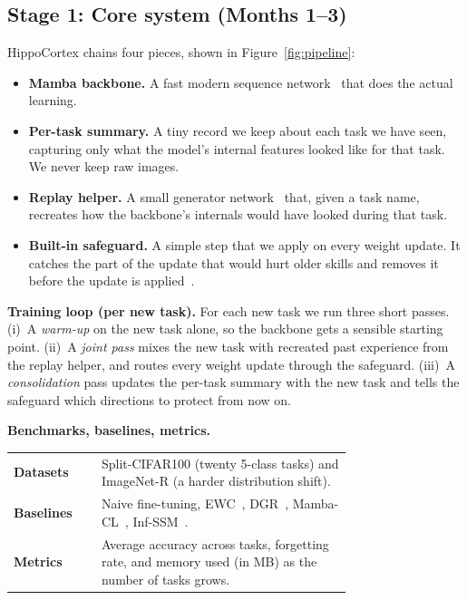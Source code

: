 \documentclass[11pt,a4paper]{article}
\begin{document}
\subsection{Stage 1: Core system (Months 1--3)}
HippoCortex chains four pieces, shown in Figure~\ref{fig:pipeline}:
\begin{itemize}[leftmargin=1.4em,itemsep=0.05em,topsep=0.1em]
  \item \textbf{Mamba backbone.} A fast modern sequence network~\citep{gu2023mamba} that does the actual learning.
  \item \textbf{Per-task summary.} A tiny record we keep about each task we have seen, capturing only what the model's internal features looked like for that task. We never keep raw images.
  \item \textbf{Replay helper.} A small generator network~\citep{sohn2015learning} that, given a task name, recreates how the backbone's internals would have looked during that task.
  \item \textbf{Built-in safeguard.} A simple step that we apply on every weight update. It catches the part of the update that would hurt older skills and removes it before the update is applied~\citep{saha2021gradient,cheng2024mambacl}.
\end{itemize}

\textbf{Training loop (per new task).} For each new task we run three short passes. (i)~A \emph{warm-up} on the new task alone, so the backbone gets a sensible starting point. (ii)~A \emph{joint pass} mixes the new task with recreated past experience from the replay helper, and routes every weight update through the safeguard. (iii)~A \emph{consolidation} pass updates the per-task summary with the new task and tells the safeguard which directions to protect from now on.

\textbf{Benchmarks, baselines, metrics.}

\begin{center}\small
\begin{tabular}{@{}l p{0.74\linewidth}@{}}
\toprule
\textbf{Datasets}   & Split-CIFAR100 (twenty 5-class tasks) and ImageNet-R (a harder distribution shift). \\
\textbf{Baselines}  & Naive fine-tuning, EWC~\citep{kirkpatrick2017overcoming}, DGR~\citep{shin2017continual}, Mamba-CL~\citep{cheng2024mambacl}, Inf-SSM~\citep{lee2025exemplarfree}. \\
\textbf{Metrics}    & Average accuracy across tasks, forgetting rate, and memory used (in MB) as the number of tasks grows. \\
\bottomrule
\end{tabular}
\end{center}
\end{document}
